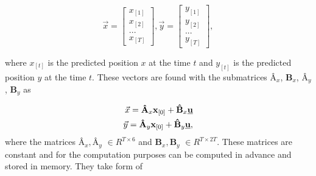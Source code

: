 \documentclass{article}
\newcommand{\uvec}{\textbf{\underline{u}}}
\begin{document}
\begin{equation}
\vec{x} =
  \begin{bmatrix}
  x_{[1]} \\
  x_{[2]} \\
  ...	   \\
  x_{[T]}
  \end{bmatrix},\vec{y} = \begin{bmatrix}
  y_{[1]} \\
  y_{[2]} \\
  ...	   \\
  y_{[T]}
  \end{bmatrix},
\end{equation}

where $x_{[t]}$ is the predicted position $x$ at the time $t$ and $y_{[t]}$ is the predicted position $y$ at the time $t$.
These vectors are found with the submatrices $\textbf{\^A}_x$, $\textbf{\^B}_x$, $\textbf{\^A}_y$, $\textbf{\^B}_y$ as

\begin{equation}
\label{eq:pos_matrixes}
\begin{split}
\vec{x} = \textbf{\^A}_x \textbf{x}_{[0]} + \textbf{\^B}_x \uvec \\
\vec{y} = \textbf{\^A}_y \textbf{x}_{[0]} + \textbf{\^B}_y \uvec, \\
\end{split}
\end{equation}
where the matrices $\textbf{\^A}_x, \textbf{\^A}_y$ $\in R^{T \times 6}$ and $\textbf{\^B}_x, \textbf{\^B}_y$ $\in R^{T \times 2T}$. These matrices are constant and for the computation purposes can be computed in advance and stored in memory. They take form of 
\end{document}
